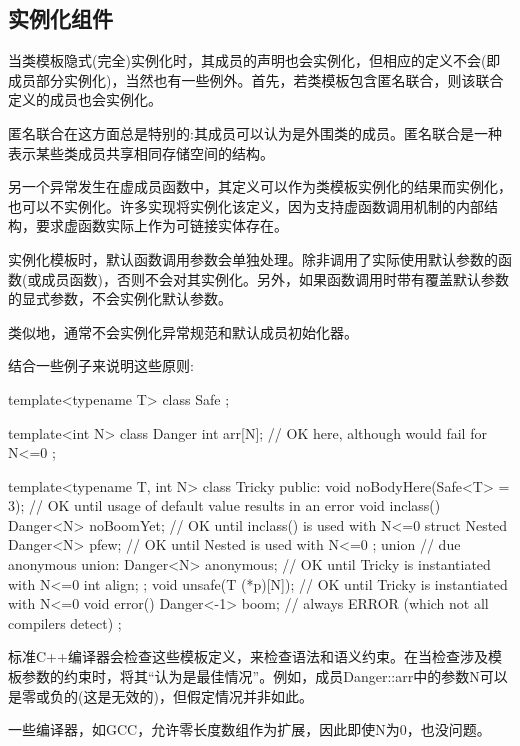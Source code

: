 \subsection{实例化组件}

当类模板隐式(完全)实例化时，其成员的声明也会实例化，但相应的定义不会(即成员部分实例化)，当然也有一些例外。首先，若类模板包含匿名联合，则该联合定义的成员也会实例化。

\begin{notice}
匿名联合在这方面总是特别的:其成员可以认为是外围类的成员。匿名联合是一种表示某些类成员共享相同存储空间的结构。
\end{notice}

另一个异常发生在虚成员函数中，其定义可以作为类模板实例化的结果而实例化，也可以不实例化。许多实现将实例化该定义，因为支持虚函数调用机制的内部结构，要求虚函数实际上作为可链接实体存在。 

实例化模板时，默认函数调用参数会单独处理。除非调用了实际使用默认参数的函数(或成员函数)，否则不会对其实例化。另外，如果函数调用时带有覆盖默认参数的显式参数，不会实例化默认参数。

类似地，通常不会实例化异常规范和默认成员初始化器。

结合一些例子来说明这些原则:

\begin{cpp}
template<typename T>
class Safe {
};

template<int N>
class Danger {
	int arr[N]; // OK here, although would fail for N<=0
};

template<typename T, int N>
class Tricky {
	public:
	void noBodyHere(Safe<T> = 3); // OK until usage of default value results in an error
	void inclass() {
		Danger<N> noBoomYet; // OK until inclass() is used with N<=0
	}
	struct Nested {
		Danger<N> pfew; // OK until Nested is used with N<=0
	};
	union { // due anonymous union:
		Danger<N> anonymous; // OK until Tricky is instantiated with N<=0
		int align;
	};
	void unsafe(T (*p)[N]); // OK until Tricky is instantiated with N<=0
	void error() {
		Danger<-1> boom; // always ERROR (which not all compilers detect)
	}
};
\end{cpp}

标准C++编译器会检查这些模板定义，来检查语法和语义约束。在当检查涉及模板参数的约束时，将其“认为是最佳情况”。例如，成员Danger::arr中的参数N可以是零或负的(这是无效的)，但假定情况并非如此。

\begin{notice}
一些编译器，如GCC，允许零长度数组作为扩展，因此即使N为0，也没问题。
\end{notice}

